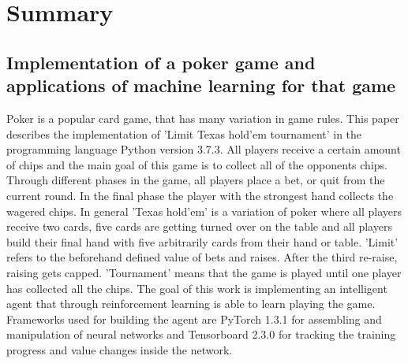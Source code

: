 \section*{Summary}
\subsection*{Implementation of a poker game and applications of machine learning for that game}

Poker is a popular card game, that has many variation in game rules. This paper describes the implementation of 'Limit Texas hold'em tournament' in the programming language Python version 3.7.3. All players receive a certain amount of chips and the main goal of this game is to collect all of the opponents chips. Through different phases in the game, all players place a bet, or quit from the current round. In the final phase the player with the strongest hand collects the wagered chips. In general 'Texas hold'em' is a variation of poker where all players receive two cards, five cards are getting turned over on the table and all players build their final hand with five arbitrarily cards from their hand or table. 'Limit' refers to the beforehand defined value of bets and raises. After the third re-raise, raising gets capped. 'Tournament' means that the game is played until one player has collected all the chips. The goal of this work is implementing an intelligent agent that through reinforcement learning is able to learn playing the game. Frameworks used for building the agent are PyTorch 1.3.1 for assembling and manipulation of neural networks and Tensorboard 2.3.0 for tracking the training progress and value changes inside the network.